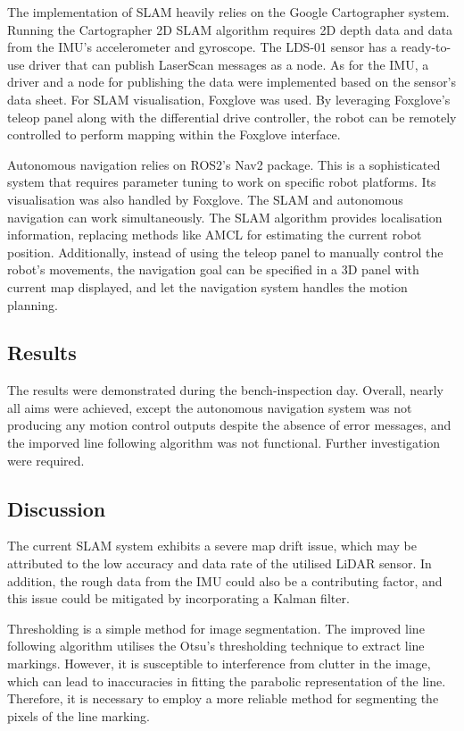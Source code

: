 The implementation of SLAM heavily relies on the Google Cartographer system. Running the Cartographer 2D SLAM algorithm requires 2D depth data and data from the IMU's accelerometer and gyroscope. The LDS-01 sensor has a ready-to-use driver that can publish LaserScan messages as a node. As for the IMU, a driver and a node for publishing the data were implemented based on the sensor's data sheet. For SLAM visualisation, Foxglove was used. By leveraging Foxglove's teleop panel along with the differential drive controller, the robot can be remotely controlled to perform mapping within the Foxglove interface.

Autonomous navigation relies on ROS2's Nav2 package. This is a sophisticated system that requires parameter tuning to work on specific robot platforms. Its visualisation was also handled by Foxglove. The SLAM and autonomous navigation can work simultaneously. The SLAM algorithm provides localisation information, replacing methods like AMCL for estimating the current robot position. Additionally, instead of using the teleop panel to manually control the robot's movements, the navigation goal can be specified in a 3D panel with current map displayed, and let the navigation system handles the motion planning.

\subsection{Results}

The results were demonstrated during the bench-inspection day. Overall, nearly all aims were achieved, except the autonomous navigation system was not producing any motion control outputs despite the absence of error messages, and the imporved line following algorithm was not functional. Further investigation were required.

\subsection{Discussion}

The current SLAM system exhibits a severe map drift issue, which may be attributed to the low accuracy and data rate of the utilised LiDAR sensor. In addition, the rough data from the IMU could also be a contributing factor, and this issue could be mitigated by incorporating a Kalman filter.

Thresholding is a simple method for image segmentation. The improved line following algorithm utilises the Otsu's thresholding technique to extract line markings. However, it is susceptible to interference from clutter in the image, which can lead to inaccuracies in fitting the parabolic representation of the line. Therefore, it is necessary to employ a more reliable method for segmenting the pixels of the line marking.

